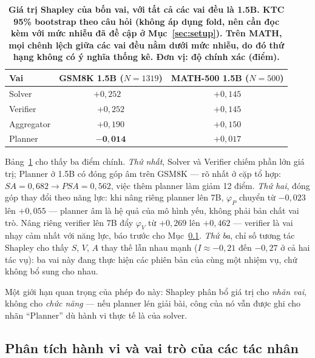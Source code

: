 \documentclass[12pt,a4paper]{article}
\begin{document}
\begin{table}[h]\centering\small
\begin{tabular}{@{}l c c@{}}
\toprule
Vai & GSM8K 1.5B (\(N=1319\)) & MATH-500 1.5B (\(N=500\))\\
\midrule
Solver     & \(+0{,}252\) \ & \(+0{,}145\) \\
Verifier   & \(+0{,}252\)  & \(+0{,}145\)\\
Aggregator & \(+0{,}190\)  & \(+0{,}150\) \\
Planner    & \(\mathbf{-0{,}014}\)  & \(+0{,}017\) \\
\bottomrule
\end{tabular}
\caption{\textbf{Giá trị Shapley của bốn vai, với tất cả các vai đều là 1.5B. KTC 95\% bootstrap theo câu hỏi (không áp dụng fold, nên cần đọc kèm với mức nhiễu đã đề cập ở Mục~\ref{sec:setup}). Trên MATH, mọi chênh lệch giữa các vai đều nằm dưới mức nhiễu, do đó thứ hạng không có ý nghĩa thống kê. Đơn vị: độ chính xác (điểm).}}
\label{tab:shapley}
\end{table}

Bảng~\ref{tab:shapley} cho thấy ba điểm chính. \textit{Thứ nhất}, Solver và Verifier chiếm phần lớn giá trị; Planner ở 1.5B có đóng góp âm trên GSM8K --- rõ nhất ở cặp tổ hợp: \(SA = 0{,}682 \to PSA = 0{,}562\), việc thêm planner làm giảm 12 điểm. \textit{Thứ hai}, đóng góp thay đổi theo năng lực: khi nâng riêng planner lên 7B, \(\varphi_P\) chuyển từ \(-0{,}023\) lên \(+0{,}055\)  --- planner âm là hệ quả của mô hình yếu, không phải bản chất vai trò. Nâng riêng verifier lên 7B đẩy \(\varphi_V\) từ \(+0{,}269\) lên \(+0{,}462\) --- verifier là vai nhạy cảm nhất với năng lực, báo trước cho Mục~\ref{sec:roles}. \textit{Thứ ba}, chỉ số tương tác Shapley cho thấy \(S\), \(V\), \(A\) thay thế lẫn nhau mạnh (\(I \approx -0{,}21\) đến \(-0{,}27\) ở cả hai tác vụ): ba vai này đang thực hiện các phiên bản của cùng một nhiệm vụ, chứ không bổ sung cho nhau.

Một giới hạn quan trọng của phép đo này: Shapley phân bổ giá trị cho \textit{nhãn vai}, không cho \textit{chức năng} --- nếu planner lén giải bài, công của nó vẫn được ghi cho nhãn ``Planner'' dù hành vi thực tế là của solver.

\subsection{Phân tích hành vi và vai trò của các tác nhân}\label{sec:roles}
\end{document}
